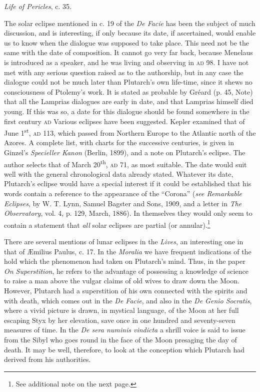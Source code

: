 \documentclass[a4paper, 11pt, oneside, polutonikogreek, english]{article}
\begin{document}
\hspace*{0pt}\hfill\emph{Life of Pericles}, c. 35.

\bigskip

The solar eclipse mentioned in c. 19 of the \emph{De Facie} has been the subject of much discussion, and is interesting, if only because its date, if ascertained, would enable us to know when the dialogue was supposed to take place. This need not be the same with the date of composition. It cannot go very far back, because Menelaus is introduced as a speaker, and he was living and observing in \textsc{ad} 98. I have not met with any serious question raised as to the authorship, but in any case the dialogue could not be much later than Plutarch's own life-time, since it shews no consciousness of Ptolemy's work. It is stated as probable by Gréard (p. 45, Note) that all the Lamprias dialogues are early in date, and that Lamprias himself died young. If this was so, a date for this dialogue should be found somewhere in the first century \textsc{ad} Various eclipses have been suggested. Kepler examined that of June 1\textsuperscript{st}, \textsc{ad} 113, which passed from Northern Europe to the Atlantic north of the Azores. A complete list, with charts for the successive centuries, is given in Ginzel's \emph{Specieller Kanon} (Berlin, 1899), and a note on Plutarch's eclipse. The author selects that of March 20\textsuperscript{th}, \textsc{ad} 71, as most suitable. The date would suit well with the general chronological data already stated. Whatever its date, Plutarch's eclipse would have a special interest if it could be established that his words contain a reference to the appearance of the ``Corona'' (\emph{see Remarkable Eclipses}, by W. T. Lynn, Samuel Bagster and Sons, 1909, and a letter in \emph{The Observatory}, vol. 4, p. 129, March, 1886). In themselves they would only seem to contain a statement that \emph{all} solar eclipses are partial (or annular).\footnote{See additional note on the next page.}

There are several mentions of lunar eclipses in the \emph{Lives}, an interesting one in that of Æmilius Paulus, c. 17. In the \emph{Moralia} we have frequent indications of the hold which the phenomenon had taken on Plutarch's mind. Thus, in the paper \emph{On Superstition}, he refers to the advantage of possessing a knowledge of science to raise a man above the vulgar claims of old wives to draw down the Moon. However, Plutarch had a superstition of his own connected with the spirits and with death, which comes out in the \emph{De Facie}, and also in the \emph{De Genio Socratis}, where a vivid picture is drawn, in mystical language, of the Moon at her full escaping Styx by her elevation, save once in one hundred and seventy-seven measures of time. In the \emph{De sera numinis vindicta} a shrill voice is said to issue from the Sibyl who goes round in the face of the Moon presaging the day of death. It may be well, therefore, to look at the conception which Plutarch had derived from his authorities.
\end{document}
